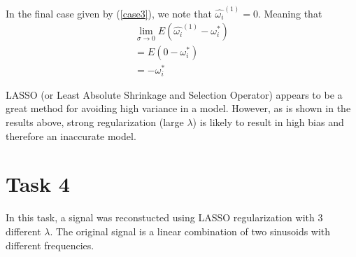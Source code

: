 \documentclass{article}
\begin{document}
In the final case given by (\ref{case3}), we note that $\hat{\omega_i}^{(1)} = 0$. Meaning that
\begin{equation}
\begin{split}
    \lim\limits_{\sigma \to 0} E(\hat{\omega_i}^{(1)} - \omega_i^{*}) \\
    = E(0 - \omega_i^{*}) \\
    = -\omega_i^{*}
\end{split}
\end{equation}

LASSO (or Least Absolute Shrinkage and Selection Operator) appears to be a great method for avoiding high variance in a model. However, as is shown in the results above, strong regularization (large $\lambda$) is likely to result in high bias and therefore an inaccurate model.

\section{Task 4}
In this task, a signal was reconstucted using LASSO regularization with 3 different $\lambda$. The original signal is a linear combination of two sinusoids with different frequencies. 
\end{document}
